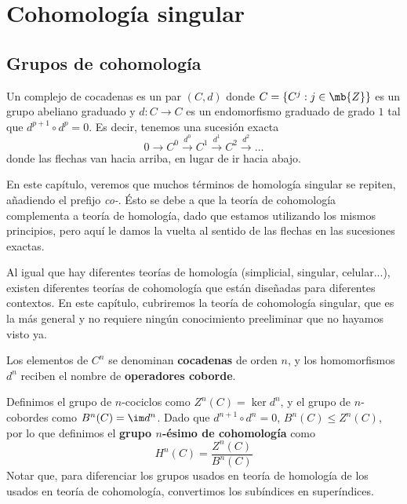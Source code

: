 \setchapterpreamble[u]{\margintoc}

\chapter{Cohomología singular}

\section{Grupos de cohomología}
\begin{definition}
Un complejo de cocadenas es un par $(C,d)$ donde $C=\{C^j: j \in \mb{Z}\}$ es
un grupo abeliano graduado y $d\colon C \to C$ es un endomorfismo graduado
de grado $1$ tal que $d^{p+1}\circ d^p=0$. Es decir, tenemos una sucesión
exacta
\[0 \longrightarrow C^0 \xrightarrow{d^0} C^1 \xrightarrow{d^1} C^2
\xrightarrow{d^2}\dots\]
donde las flechas van hacia arriba, en lugar de ir hacia abajo.
\end{definition}

En este capítulo, veremos que muchos términos de homología singular se
repiten, añadiendo el prefijo \emph{co-}. Ésto se debe a que la teoría de
cohomología complementa a teoría de homología, dado que estamos utilizando
los mismos principios, pero aquí le damos la vuelta al sentido de las flechas
en las sucesiones exactas.

Al igual que hay diferentes teorías de homología (simplicial, singular,
celular...), existen diferentes teorías de cohomología que están diseñadas
para diferentes contextos. En este capítulo, cubriremos la teoría de
cohomología singular, que es la más general y no requiere ningún conocimiento
preeliminar que no hayamos visto ya.

Los elementos de $C^n$ se denominan \textbf{cocadenas} de orden $n$, y los
homomorfismos $d^n$ reciben el nombre de \textbf{operadores coborde}.


Definimos el grupo de $n$-cociclos como $Z^n(C)=\ker d^n$, y el grupo de $n$-
cobordes como $B^n(C)=\im d^n$. Dado que $d^{n+1}\circ d^n=0$, $B^n(C)\leq
Z^n(C)$, por lo que definimos el \textbf{grupo $n$-ésimo de cohomología} como
\[H^n(C)=\frac{Z^n(C)}{B^n(C)}\]
Notar que, para diferenciar los grupos usados en teoría de homología de los
usados en teoría de cohomología, convertimos los subíndices en superíndices.

